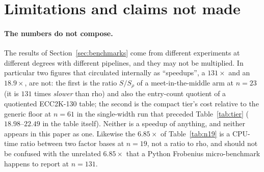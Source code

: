 \section{Limitations and claims not made}
\label{sec:limitations}

\paragraph{The numbers do not compose.}
The results of Section~\ref{sec:benchmarks} come from different
experiments at different degrees with different pipelines, and they
may not be multiplied. In particular two figures that circulated
internally as ``speedups'', a $131\times$ and an $18.9\times$, are not:
the first is the ratio $S/S_\rho$ of a meet-in-the-middle arm at
$n=23$ (it is $131$ times \emph{slower} than rho) and also the
entry-count quotient of a quotiented ECC2K-130 table; the second is
the compact tier's cost relative to the generic floor at $n=61$ in
the single-width run that preceded Table~\ref{tab:tier} ($18.98$--$22.49$
in the table itself). Neither is a speedup of anything, and neither
appears in this paper as one. Likewise the $6.85\times$ of
Table~\ref{tab:n19} is a CPU-time ratio between two factor bases at
$n=19$, not a ratio to rho, and should not be confused with the
unrelated $6.85\times$ that a Python Frobenius micro-benchmark happens
to report at $n=131$.

